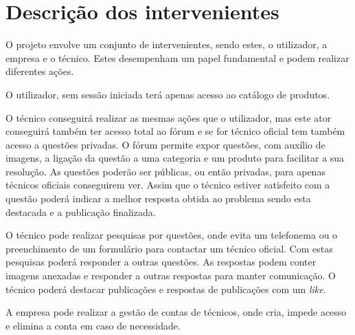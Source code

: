 \section{Descrição dos intervenientes}
O projeto envolve um conjunto de intervenientes, sendo estes, o utilizador, a empresa e o técnico. Estes desempenham um papel fundamental e podem realizar diferentes ações.

O utilizador, sem sessão iniciada terá apenas acesso ao catálogo de produtos.

O técnico conseguirá realizar as mesmas ações que o utilizador, mas este ator conseguirá também ter acesso total ao fórum e se for técnico oficial tem também acesso a questões privadas. O fórum permite expor questões, com auxílio de imagens, a ligação da questão a uma categoria e um produto para facilitar a sua resolução. As questões poderão ser públicas, ou então privadas, para apenas técnicos oficiais conseguirem ver. Assim que o técnico estiver satisfeito com a questão poderá indicar a melhor resposta obtida ao problema sendo esta destacada e a publicação finalizada.

O técnico pode realizar pesquisas por questões, onde evita um telefonema ou o preenchimento de um formulário para contactar um técnico oficial. Com estas pesquisas poderá responder a outras questões. As respostas podem conter imagens anexadas e responder a outras respostas para manter comunicação. O técnico poderá destacar publicações e respostas de publicações com um \textit{like}.

A empresa pode realizar a gestão de contas de técnicos, onde cria, impede acesso e elimina a conta em caso de necessidade.
